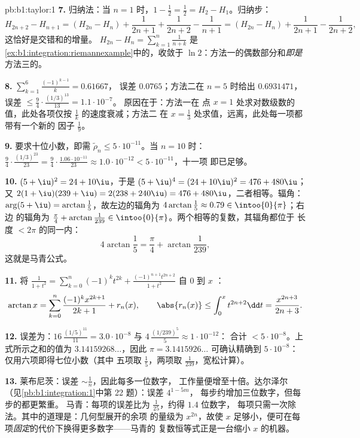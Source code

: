 \begin{solution}{pb:b1:taylor:1}
\textbf{7.} 归纳法：当 $n = 1$ 时，$1 - \frac12 = \frac12 = H_2
- H_1$。归纳步：
\[
H_{2n+2} - H_{n+1} = (H_{2n} - H_n) + \frac{1}{2n+1} +
\frac{1}{2n+2} - \frac{1}{n+1}
= (H_{2n} - H_n) + \frac{1}{2n+1} - \frac{1}{2n+2},
\]
这恰好是交错和的增量。
$H_{2n} - H_n = \sum_{k=1}^{n}\frac{1}{n+k}$ 是
\cref{ex:b1:integration:riemannexample}中的，收敛于 $\ln
2$：方法一的偶数部分和\emph{即是}
方法三的。

\textbf{8.} $\sum_{k=1}^{6}\frac{(-1)^{k-1}}{k} = 0.61667$，
误差 $0.0765$；方法二在 $n = 5$ 时给出 $0.6931471$，误差
$\leq \frac94\cdot\frac{(1/3)^{13}}{13} = 1.1\cdot10^{-7}$。
原因在于：方法一在
点 $x = 1$ 处求对数级数的值，此处各项仅按 $\frac1k$ 的速度衰减；方法二
在 $x = \frac13$ 处求值，远离，此处每一项都带有一个新的
因子 $\frac19$。

\textbf{9.} 要求十位小数，即需 $\tilde\rho_n \leq
5\cdot10^{-11}$。当 $n = 10$ 时：$\frac94 \cdot
\frac{(1/3)^{23}}{23} = \frac94\cdot\frac{1.06\cdot10^{-11}}{23}
\approx 1.0\cdot10^{-12} < 5\cdot10^{-11}$，十一项
即已足够。

\textbf{10.} $(5+\iu)^2 = 24 + 10\iu$，于是 $(5+\iu)^4 = (24 +
10\iu)^2 = 476 + 480\iu$；又 $2(1+\iu)(239+\iu) = 2(238 +
240\iu) = 476 + 480\iu$，二者相等。辐角：$\arg(5 + \iu) =
\arctan\frac15$，故左边的辐角为
$4\arctan\frac15 \approx 0.79 \in \intoo{0}{\pi}$；右边
的辐角为 $\frac\pi4 + \arctan\frac{1}{239} \in
\intoo{0}{\pi}$。两个相等的复数，其辐角都位于
长度 $< 2\pi$ 的同一内：
\[
4\arctan\frac15 = \frac\pi4 + \arctan\frac{1}{239} ,
\]
这就是马青公式。

\textbf{11.} 将 $\frac{1}{1+t^2} = \sum_{k=0}^n (-1)^k
t^{2k} + \frac{(-1)^{n+1}t^{2n+2}}{1+t^2}$ 自 $0$ 到 $x$ ：
\[
\arctan x = \sum_{k=0}^{n}\frac{(-1)^k x^{2k+1}}{2k+1} +
r_n(x),
\qquad
\abs{r_n(x)} \leq \int_0^x t^{2n+2}\dd t =
\frac{x^{2n+3}}{2n+3} .
\]

\textbf{12.} 误差为：$16\,\frac{(1/5)^{11}}{11} = 3.0\cdot
10^{-8}$ 与 $4\,\frac{(1/239)^5}{5} \approx 1\cdot10^{-12}$：
合计 $< 5\cdot10^{-8}$。上式所示之和的值为
$3.14159268\dots$，因此 $\pi = 3.1415926\dots$ 可确认精确到
$5\cdot10^{-8}$：仅用六项即得七位小数（其中
五项取 $\frac15$，两项取 $\frac1{239}$，宽松计算）。

\textbf{13.} 莱布尼茨：误差 $\sim \frac1n$，因此每多一位数字，
工作量便增至十倍。达尔泽尔
（见\cref{pb:b1:integration:1}中第 22 题）：误差 $4^{1-5m}$，
每步约增加三位数字，但每步的都更繁重。
马青：每项的误差比为 $\frac{1}{25}$，约得 $1.4$ 位数字，
每项只需一次除法。其中的道理是：几何型展开的余项
的量级为 $x^{2n}$，故使 $x$
足够小，便可在每项\emph{固定}的代价下换得更多数字——马青的
复数恒等式正是一台缩小 $x$ 的机器。


\end{solution}
